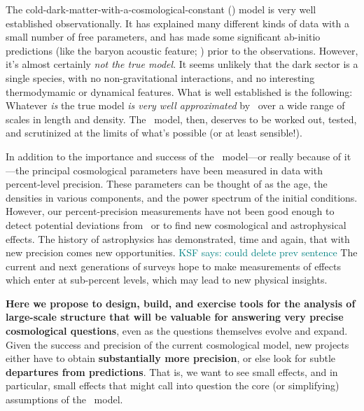 \documentclass[12pt, fullpage, letterpaper]{article}
\newcommand{\KSF}[1]{\textcolor{teal}{KSF says: #1}}
\begin{document}
The cold-dark-matter-with-a-cosmological-constant (\LCDM) model is
very well established observationally.
It has explained many different
kinds of data with a small number of free parameters, and has made
some significant ab-initio predictions (like the baryon acoustic feature; \citealt{EisensteinHu1998})
prior to the observations.
However, it's almost certainly \emph{not the true model}.
It seems unlikely that the dark sector is a single species, with no
non-gravitational interactions, and no interesting thermodymamic or
dynamical features.
What is well established is the following:
Whatever \emph{is} the true model \emph{is very well approximated} by
\LCDM\ over a wide range of scales in length and density.
The \LCDM\ model, then, deserves to be worked out, tested, and scrutinized at the
limits of what's possible (or at least sensible!).

In addition to the importance and success of the \LCDM\ model---or
really because of it---the principal cosmological parameters have been
measured in data with percent-level precision.
These parameters can be thought of as the age, the densities in
various components, and the power spectrum of the initial conditions.
However, our percent-precision measurements have not been good enough to
detect potential deviations from \LCDM\, or to find new
cosmological and astrophysical effects.
The history of astrophysics has demonstrated, time and again,
that with new precision comes new opportunities.
\KSF{could delete prev sentence}
The current and next generations of surveys hope to
make measurements of effects which enter at sub-percent levels,
which may lead to new physical insights.

\textbf{Here we propose to design, build, and exercise tools for the
analysis of large-scale structure that will
  be valuable for answering very precise cosmological questions}, even
as the questions themselves evolve and expand.
Given the success and precision of the current
cosmological model, new projects either have to obtain
\textbf{substantially more precision}, or else look for subtle
\textbf{departures from predictions}.
That is, we want to see small effects, and in particular, small
effects that might call into question the core (or simplifying) assumptions of the
\LCDM\ model.
\end{document}
